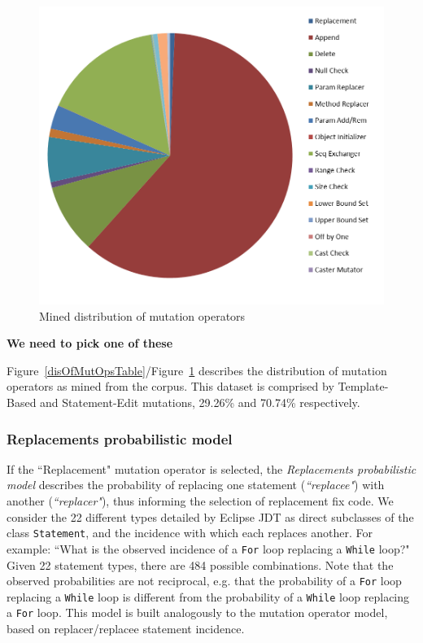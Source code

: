 \documentclass[conference]{IEEEtran}
\newcommand{\todo}[1]
  {{\scriptsize \textbf{\color{red} {#1}}}}
\begin{document}
\begin{figure}[!h]
  \centering
    \includegraphics[width=\columnwidth]{disOfMutOps}
  \caption{Mined distribution of mutation operators}
  \label{disOfMutOpsGraph}
\end{figure}

\todo{We need to pick one of these}

Figure~\ref{disOfMutOpsTable}/Figure~\ref{disOfMutOpsGraph} describes the distribution of mutation operators
as mined from the corpus. This dataset is comprised by Template-Based and Statement-Edit mutations, 29.26\% and 70.74\% respectively.

\subsubsection{Replacements probabilistic model}
If the ``Replacement" mutation operator is 
selected, the \textit{Replacements probabilistic model} describes the probability of replacing one statement (\emph{``replacee"}) with
another (\emph{``replacer"}), thus informing the selection of replacement fix code.
We consider 
the 22 different types detailed by Eclipse
JDT
as direct subclasses of the class \texttt{Statement}, and the incidence with which
each 
replaces another. For example: ``What is the observed incidence of a \texttt{For} loop 
replacing a \texttt{While} loop?" Given 22 statement types, there are 484 possible combinations. 
Note that the observed probabilities are not reciprocal, e.g. 
that the probability of a \texttt{For} loop replacing a \texttt{While} loop is different from the 
probability of a \texttt{While} loop replacing a \texttt{For} loop.
This model is built analogously to the
mutation operator model, based on replacer/replacee statement incidence. 
\end{document}
